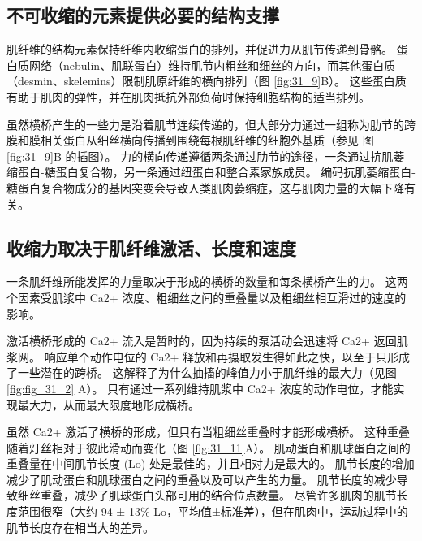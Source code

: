 \subsection{不可收缩的元素提供必要的结构支撑}
肌纤维的结构元素保持纤维内收缩蛋白的排列，并促进力从肌节传递到骨骼。 蛋白质网络（nebulin、肌联蛋白）维持肌节内粗丝和细丝的方向，而其他蛋白质（desmin、skelemins）限制肌原纤维的横向排列（图 \ref{fig:31_9}B）。 这些蛋白质有助于肌肉的弹性，并在肌肉抵抗外部负荷时保持细胞结构的适当排列。

虽然横桥产生的一些力是沿着肌节连续传递的，但大部分力通过一组称为肋节的跨膜和膜相关蛋白从细丝横向传播到围绕每根肌纤维的细胞外基质（参见 图 \ref{fig:31_9}B 的插图）。 力的横向传递遵循两条通过肋节的途径，一条通过抗肌萎缩蛋白-糖蛋白复合物，另一条通过纽蛋白和整合素家族成员。 编码抗肌萎缩蛋白-糖蛋白复合物成分的基因突变会导致人类肌肉萎缩症，这与肌肉力量的大幅下降有关。

\subsection{收缩力取决于肌纤维激活、长度和速度}
一条肌纤维所能发挥的力量取决于形成的横桥的数量和每条横桥产生的力。 这两个因素受肌浆中 Ca2+ 浓度、粗细丝之间的重叠量以及粗细丝相互滑过的速度的影响。

激活横桥形成的 Ca2+ 流入是暂时的，因为持续的泵活动会迅速将 Ca2+ 返回肌浆网。 响应单个动作电位的 Ca2+ 释放和再摄取发生得如此之快，以至于只形成了一些潜在的跨桥。 这解释了为什么抽搐的峰值力小于肌纤维的最大力（见图 \ref{fig:fig_31_2} A）。 只有通过一系列维持肌浆中 Ca2+ 浓度的动作电位，才能实现最大力，从而最大限度地形成横桥。

虽然 Ca2+ 激活了横桥的形成，但只有当粗细丝重叠时才能形成横桥。
这种重叠随着灯丝相对于彼此滑动而变化（图 \ref{fig:31_11}A）。 
肌动蛋白和肌球蛋白之间的重叠量在中间肌节长度 (Lo) 处是最佳的，并且相对力是最大的。 肌节长度的增加减少了肌动蛋白和肌球蛋白之间的重叠以及可以产生的力量。 肌节长度的减少导致细丝重叠，减少了肌球蛋白头部可用的结合位点数量。 尽管许多肌肉的肌节长度范围很窄（大约 94 ± 13\% Lo，平均值±标准差），但在肌肉中，运动过程中的肌节长度存在相当大的差异。

